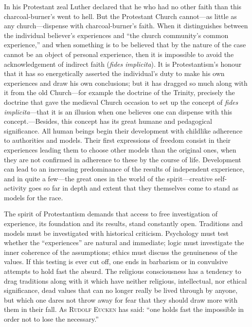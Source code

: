 \documentclass[12pt,a4paper]{book}
\newcommand{\opage}[1]{\marginnote{\footnotesize\textit{[#1]}}}
\begin{document}
In his Protestant zeal Luther declared that he who had no other faith than this
charcoal-burner's went to hell. But the Protestant Church cannot---as little as
any church---dispense with charcoal-burner's faith. When it distinguishes between
the individual believer's experiences and ``the church community's common
experience,'' and when something is to be believed that by the nature of the case
cannot be an object of personal experience, then it is impossible to avoid the
acknowledgement of indirect faith (\textit{fides implicita}). It is Protestantism's
honour that it has so energetically asserted the individual's duty to make his own
experiences and draw his own conclusions; but it has dragged so much along with it
from the old Church---for example the doctrine of the Trinity, precisely the
doctrine that gave the medieval Church occasion to set up the concept of
\textit{fides implicita}---that it is an illusion when one believes one can
dispense with this concept.---Besides, this concept has its great humane 
\opage{80}and
pedagogical significance. All human beings begin their development with childlike
adherence to authorities and models. Their first expressions of freedom consist in
their experiences leading them to choose other models than the original ones, when
they are not confirmed in adherence to these by the course of life. Development
can lead to an increasing predominance of the results of independent experience,
and in quite a few---the great ones in the world of the spirit---creative
self-activity goes so far in depth and extent that they themselves come to stand
as models for the race.

The spirit of Protestantism demands that access to free investigation of
experience, its foundation and its results, stand constantly open. Traditions and
models must be investigated with historical criticism. Psychology must test
whether the ``experiences'' are natural and immediate; logic must investigate the
inner coherence of the assumptions; ethics must discuss the genuineness of the
values. If this testing is ever cut off, one ends in barbarism or in convulsive
attempts to hold fast the absurd. The religious consciousness has a tendency to
drag traditions along with it which have neither religious, intellectual, nor
ethical significance, dead values that can no longer really be lived through by
anyone, but which one dares not throw away for fear that they should draw more
with them in their fall. As \textsc{Rudolf Eucken} has said: ``one holds fast the
impossible in order not to lose the necessary.''
\end{document}
